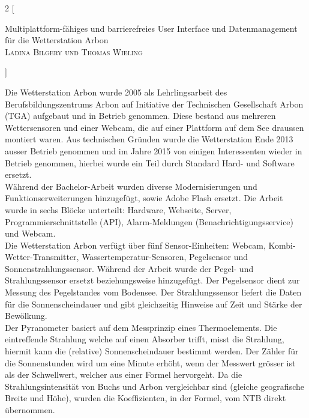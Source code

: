 \documentclass[10pt]{article}
\begin{document}
\begin{multicols}{2}
[
    \begin{center}
      {\huge\sffamily Multiplattform-fähiges und barrierefreies User Interface und Datenmanagement für die Wetterstation Arbon}\\
       \vspace{2ex}
       \textsc{Ladina Bilgery und Thomas Wieling}
    \end{center}
]

Die Wetterstation Arbon wurde 2005 als Lehrlingsarbeit des Berufsbildungszentrums Arbon auf Initiative der Technischen Gesellschaft Arbon (TGA) aufgebaut und in Betrieb genommen. Diese bestand aus mehreren Wettersensoren und einer Webcam, die auf einer Plattform auf dem See draussen montiert waren. Aus technischen Gründen wurde die Wetterstation Ende 2013 ausser Betrieb genommen und im Jahre 2015 von einigen Interessenten wieder in Betrieb genommen, hierbei wurde ein Teil durch Standard Hard- und Software ersetzt.\\
Während der Bachelor-Arbeit wurden diverse Modernisierungen und Funktionserweiterungen hinzugefügt, sowie Adobe Flash ersetzt. Die Arbeit wurde in sechs Blöcke unterteilt: Hardware, Webseite, Server, Programmierschnittstelle (API), Alarm-Meldungen (Benachrichtigungsservice) und Webcam.\\
Die Wetterstation Arbon verfügt über fünf Sensor-Einheiten: Webcam, Kombi-Wetter-Transmitter, Wassertemperatur-Sensoren, Pegelsensor und Sonnenstrahlungssensor. Während der Arbeit wurde der Pegel- und Strahlungssensor ersetzt beziehungsweise hinzugefügt. Der Pegelsensor dient zur Messung des Pegelstandes vom Bodensee. Der Strahlungssensor liefert die Daten für die Sonnenscheindauer und gibt gleichzeitig Hinweise auf Zeit und Stärke der Bewölkung.\\ 
Der Pyranometer basiert auf dem Messprinzip eines Thermoelements. Die eintreffende Strahlung welche auf einen Absorber trifft, misst die Strahlung, hiermit kann die (relative) Sonnenscheindauer bestimmt werden. Der Zähler für die Sonnenstunden wird um eine Minute erhöht, wenn der Messwert grösser ist als der Schwellwert, welcher aus einer Formel hervorgeht. Da die Strahlungsintensität von Buchs und Arbon vergleichbar sind (gleiche geografische Breite und Höhe), wurden die Koeffizienten, in der Formel, vom NTB direkt übernommen.\\

\end{multicols}
\end{document}
